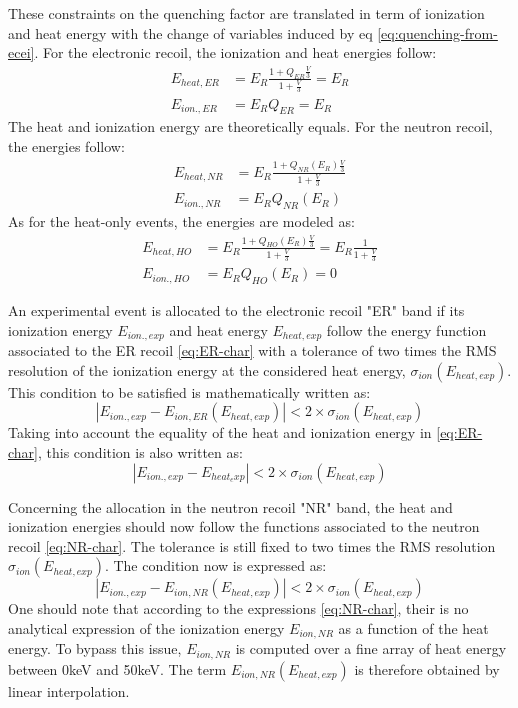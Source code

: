 These constraints on the quenching factor are translated in term of ionization and heat energy with the change of variables induced by eq \ref{eq:quenching-from-ecei}. For the electronic recoil, the ionization and heat energies follow:
\begin{align}
\label{eq:ER-char}
	E_{heat, ER} &= E_R \frac{1 + Q_{ER}\frac{V}{3}}{1 + \frac{V}{3}} = E_R \\
	E_{ion., ER} &= E_R Q_{ER} = E_R
\end{align}
The heat and ionization energy are theoretically equals.
For the neutron recoil, the energies follow:
\begin{align}
\label{eq:NR-char}
	E_{heat, NR} &= E_R \frac{1 + Q_{NR}(E_R)\frac{V}{3}}{1 + \frac{V}{3}} \\
	E_{ion., NR} &= E_R Q_{NR}(E_R)
\end{align}
As for the heat-only events, the energies are modeled as:
\begin{align}
\label{eq:HO-char}
	E_{heat, HO} &= E_R \frac{1 + Q_{HO}(E_R)\frac{V}{3}}{1 + \frac{V}{3}} = E_R \frac{1}{1 + \frac{V}{3}} \\
	E_{ion., HO} &= E_R Q_{HO}(E_R) = 0
\end{align}

An experimental event is allocated to the electronic recoil "ER" band if its ionization energy $E_{ion., exp}$ and heat energy $E_{heat, exp}$ follow the energy function associated to the ER recoil \ref{eq:ER-char} with a tolerance of two times the RMS resolution of the ionization energy at the considered heat energy, $\sigma_{ion}(E_{heat, exp})$. This condition to be satisfied is mathematically written as:
\begin{equation}
|E_{ion., exp} - E_{ion, ER}(E_{heat, exp})| < 2 \times \sigma_{ion}\left( E_{heat, exp}\right)
\end{equation}
Taking into account the equality of the heat and ionization energy in \ref{eq:ER-char}, this condition is also written as:
\begin{equation}
\label{eq:condition-ER-ecei}
|E_{ion., exp} - E_{heat_exp}| < 2 \times \sigma_{ion}\left( E_{heat, exp}\right)
\end{equation}

Concerning the allocation in the neutron recoil "NR" band, the heat and ionization energies should now follow the functions associated to the neutron recoil \ref{eq:NR-char}. The tolerance is still fixed to two times the RMS resolution $\sigma_{ion}(E_{heat, exp})$. The condition now is expressed as:
\begin{equation}
\label{eq:condition-NR-ecei}
|E_{ion., exp} - E_{ion, NR}(E_{heat, exp})| < 2 \times \sigma_{ion}\left( E_{heat, exp}\right)
\end{equation}
One should note that according to the expressions \ref{eq:NR-char}, their is no analytical expression of the ionization energy $E_{ion, NR}$ as a function of the heat energy. To bypass this issue, $E_{ion, NR}$ is computed over a fine array of heat energy between 0keV and 50keV. The term $E_{ion, NR}(E_{heat, exp})$ is therefore obtained by linear interpolation.

